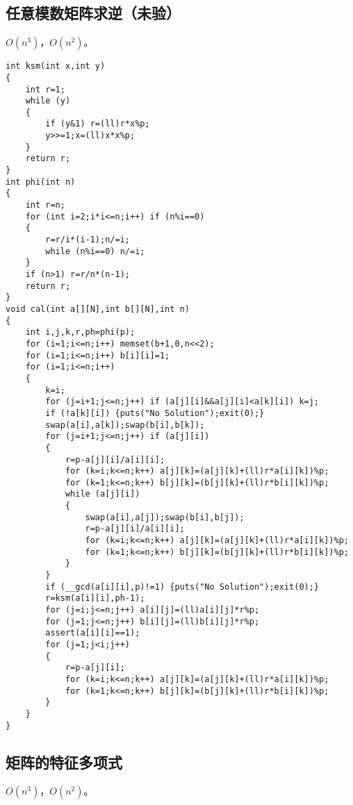 \documentclass{ctexart}
\begin{document}
\subsection{任意模数矩阵求逆（未验）}

$O(n^3)$，$O(n^2)$。

\begin{lstlisting}
int ksm(int x,int y)
{
	int r=1;
	while (y)
	{
		if (y&1) r=(ll)r*x%p;
		y>>=1;x=(ll)x*x%p;
	}
	return r;
}
int phi(int n)
{
	int r=n;
	for (int i=2;i*i<=n;i++) if (n%i==0)
	{
		r=r/i*(i-1);n/=i;
		while (n%i==0) n/=i;
	}
	if (n>1) r=r/n*(n-1);
	return r;
}
void cal(int a[][N],int b[][N],int n)
{
	int i,j,k,r,ph=phi(p);
	for (i=1;i<=n;i++) memset(b+1,0,n<<2);
	for (i=1;i<=n;i++) b[i][i]=1;
	for (i=1;i<=n;i++)
	{
		k=i;
		for (j=i+1;j<=n;j++) if (a[j][i]&&a[j][i]<a[k][i]) k=j;
		if (!a[k][i]) {puts("No Solution");exit(0);}
		swap(a[i],a[k]);swap(b[i],b[k]);
		for (j=i+1;j<=n;j++) if (a[j][i])
		{
			r=p-a[j][i]/a[i][i];
			for (k=i;k<=n;k++) a[j][k]=(a[j][k]+(ll)r*a[i][k])%p;
			for (k=1;k<=n;k++) b[j][k]=(b[j][k]+(ll)r*b[i][k])%p;
			while (a[j][i])
			{
				swap(a[i],a[j]);swap(b[i],b[j]);
				r=p-a[j][i]/a[i][i];
				for (k=i;k<=n;k++) a[j][k]=(a[j][k]+(ll)r*a[i][k])%p;
				for (k=1;k<=n;k++) b[j][k]=(b[j][k]+(ll)r*b[i][k])%p;
			}
		}
		if (__gcd(a[i][i],p)!=1) {puts("No Solution");exit(0);}
		r=ksm(a[i][i],ph-1);
		for (j=i;j<=n;j++) a[i][j]=(ll)a[i][j]*r%p;
		for (j=1;j<=n;j++) b[i][j]=(ll)b[i][j]*r%p;
		assert(a[i][i]==1);
		for (j=1;j<i;j++)
		{
			r=p-a[j][i];
			for (k=i;k<=n;k++) a[j][k]=(a[j][k]+(ll)r*a[i][k])%p;
			for (k=1;k<=n;k++) b[j][k]=(b[j][k]+(ll)r*b[i][k])%p;
		}
	}
}
\end{lstlisting}

\subsection{矩阵的特征多项式}

$O(n^3)$，$O(n^2)$。
\end{document}
